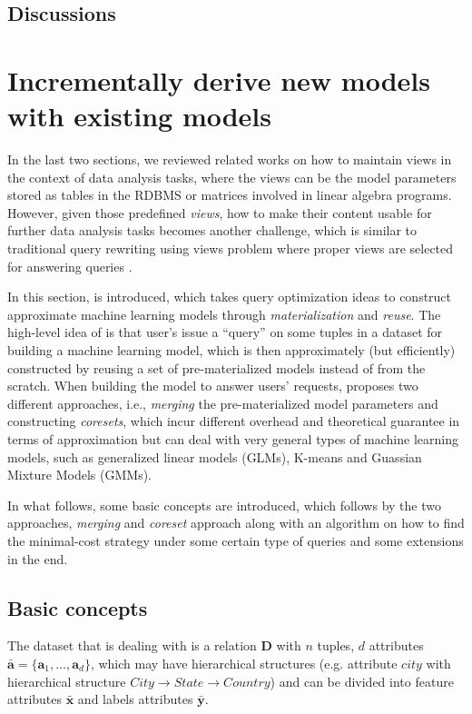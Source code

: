 \subsection{Discussions}

\section{Incrementally derive new models with existing models}
In the last two sections, we reviewed related works on how to maintain views in the context of data analysis tasks, where the views can be the model parameters stored as tables in the RDBMS or matrices involved in linear algebra programs. However, given those predefined {\em views}, how to make their content usable for further data analysis tasks becomes another challenge, which is similar to traditional query rewriting using views problem where proper views are selected for answering queries \cite{halevy2001answering}.

In this section, \cite{hasani2018efficient} is introduced, which takes query optimization ideas to construct approximate machine learning models through {\em materialization} and {\em reuse}. The high-level idea of \cite{hasani2018efficient} is that user's issue a ``query'' on some tuples in a dataset for building a machine learning model, which is then approximately (but efficiently) constructed by reusing a set of pre-materialized models instead of from the scratch. When building the model to answer users' requests, \cite{hasani2018efficient} proposes two different approaches, i.e., {\em merging} the pre-materialized model parameters and constructing {\em coresets}, which incur different overhead and theoretical guarantee in terms of approximation but can deal with very general types of machine learning models, such as generalized linear models (GLMs), K-means and Guassian Mixture Models (GMMs).

In what follows, some basic concepts are introduced, which follows by the two approaches, {\em merging} and {\em coreset} approach along with an algorithm on how to find the minimal-cost strategy under some certain type of queries and some extensions in the end.


\subsection{Basic concepts}
The dataset that \cite{hasani2018efficient} is dealing with is a relation $\textbf{D}$ with $n$ tuples, $d$ attributes $\bar{\textbf{a}} = \{\textbf{a}_1, \dots, \textbf{a}_d\}$, which may have hierarchical structures (e.g. attribute $city$ with hierarchical structure $City \rightarrow State \rightarrow Country$) and can be divided into feature attributes $\bar{\textbf{x}}$ and labels attributes $\bar{\textbf{y}}$.

